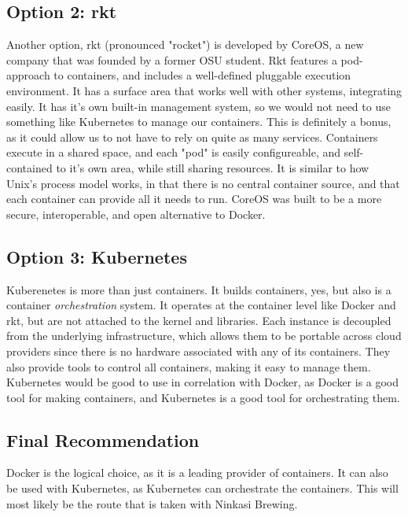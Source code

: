         
    \subsection{Option 2: rkt}
        Another option, rkt (pronounced "rocket") is developed by CoreOS, a new company that was founded by a former OSU student. 
        Rkt features a pod-approach to containers, and includes a well-defined pluggable execution environment. 
        It has a surface area that works well with other systems, integrating easily.
        It has it's own built-in management system, so we would not need to use something like Kubernetes to manage our containers. This is definitely a bonus, as it could allow us to not have to rely on quite as many services. Containers execute in a shared space, and each "pod" is easily configureable, and self-contained to it's own area, while still sharing resources. It is similar to how Unix's process model works, in that there is no central container source, and that each container can provide all it needs to run. CoreOS was built to be a more secure, interoperable, and open alternative to Docker. \cite{rktvsdock} 
        
        
        \subsection{Option 3: Kubernetes}
        Kuberenetes is more than just containers. It builds containers, yes, but also is a container \textit{orchestration} system.
        It operates at the container level like Docker and rkt, but are not attached to the kernel and libraries. Each instance is decoupled from the underlying infrastructure, which allows them to be portable across cloud providers since there is no hardware associated with any of its containers. They also provide tools to control all containers, making it easy to manage them. \cite{kubernetes} Kubernetes would be good to use in correlation with Docker, as Docker is a good tool for making containers, and Kubernetes is a good tool for orchestrating them.
        
        \subsection{Final Recommendation}
        Docker is the logical choice, as it is a leading provider of containers. It can also be used with Kubernetes, as Kubernetes can orchestrate the containers. This will most likely be the route that is taken with Ninkasi Brewing.
        
